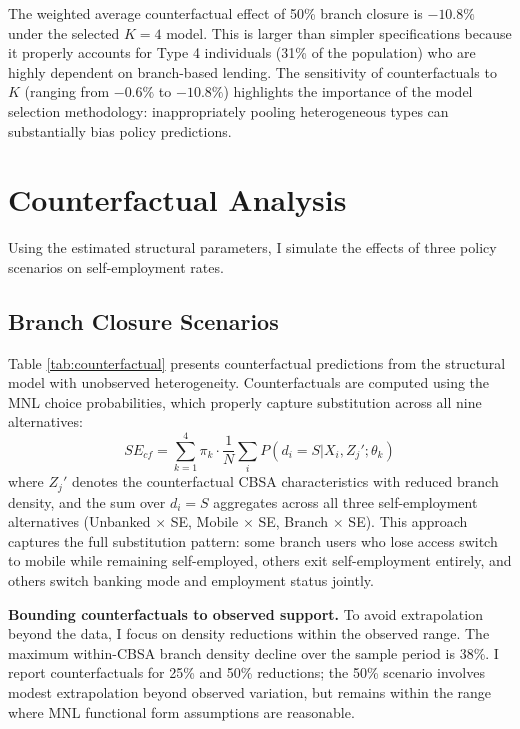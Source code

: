 \documentclass[12pt]{article}
\begin{document}
The weighted average counterfactual effect of 50\% branch closure is $-10.8\%$ under the selected $K=4$ model. This is larger than simpler specifications because it properly accounts for Type 4 individuals (31\% of the population) who are highly dependent on branch-based lending. The sensitivity of counterfactuals to $K$ (ranging from $-0.6\%$ to $-10.8\%$) highlights the importance of the model selection methodology: inappropriately pooling heterogeneous types can substantially bias policy predictions.

\section{Counterfactual Analysis}

Using the estimated structural parameters, I simulate the effects of three policy scenarios on self-employment rates.

\subsection{Branch Closure Scenarios}

Table \ref{tab:counterfactual} presents counterfactual predictions from the structural model with unobserved heterogeneity. Counterfactuals are computed using the MNL choice probabilities, which properly capture substitution across all nine alternatives:
\begin{equation}
SE_{cf} = \sum_{k=1}^{4} \pi_k \cdot \frac{1}{N} \sum_i P(d_i = S | X_i, Z_j'; \theta_k)
\end{equation}
where $Z_j'$ denotes the counterfactual CBSA characteristics with reduced branch density, and the sum over $d_i = S$ aggregates across all three self-employment alternatives (Unbanked $\times$ SE, Mobile $\times$ SE, Branch $\times$ SE). This approach captures the full substitution pattern: some branch users who lose access switch to mobile while remaining self-employed, others exit self-employment entirely, and others switch banking mode and employment status jointly.

\textbf{Bounding counterfactuals to observed support.} To avoid extrapolation beyond the data, I focus on density reductions within the observed range. The maximum within-CBSA branch density decline over the sample period is 38\%. I report counterfactuals for 25\% and 50\% reductions; the 50\% scenario involves modest extrapolation beyond observed variation, but remains within the range where MNL functional form assumptions are reasonable.
\end{document}
